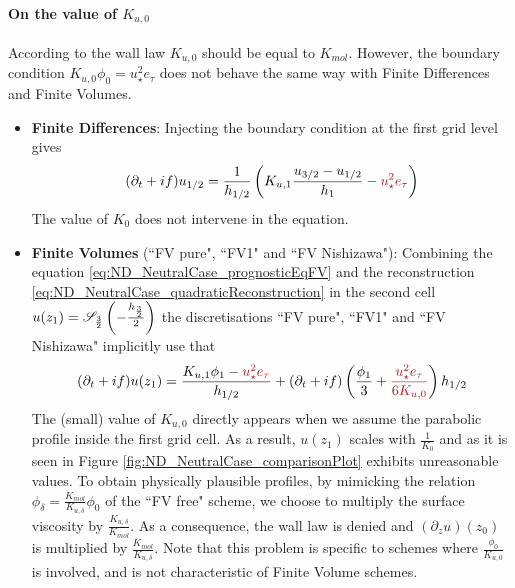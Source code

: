 \paragraph{On the value of $K_{u,0}$}
\label{sec:ND_StratifiedCase_viscosity0_FVpure}
According to the wall law $K_{u,0}$ should be equal to $K_{mol}$.
However, the boundary condition $K_{u,0} \phi_0 = u_\star^2 e_\tau$
does not behave the same way with Finite Differences and Finite
Volumes.
\begin{itemize}
	\item \textbf{Finite Differences}:
Injecting the boundary condition at the first grid level gives
		\begin{equation}
			(\partial_t+if) u_{1/2} = \frac{1}{h_{1/2}}
			\left(K_{u,1}\frac{u_{3/2} - u_{1/2}}{h_1}
			 - \emphase{u_\star^2 e_\tau} \right)
		\end{equation}
The value of $K_0$ does not intervene in the equation.
\item \textbf{Finite Volumes} (``FV pure", ``FV1" and ``FV Nishizawa"):
Combining the equation \eqref{eq:ND_NeutralCase_prognosticEqFV}
and the reconstruction
\eqref{eq:ND_NeutralCase_quadraticReconstruction} in the second cell
$u(z_1) = {\cal S}_{\frac{3}{2}}\left(-\frac{h_\frac{3}{2}}{2}\right)$
the discretisations ``FV pure", ``FV1" and ``FV Nishizawa"
implicitly use that
\begin{equation}
	(\partial_t+if) u(z_1) =
	\frac{K_{u,1} \phi_1 - \emphase{u_\star^2 e_\tau}}{h_{1/2}}
	+ (\partial_t+if)\left(\frac{\phi_1}{3}
	+ \emphase{\frac{u_\star^2 e_\tau}{6 K_{u,0}}}\right)h_{1/2}
\end{equation}
The (small) value of $K_{u,0}$ directly appears when we assume the
parabolic profile inside the first grid cell.
As a result, $u(z_1)$ scales with $\frac{1}{K_0}$ and
as it is seen in Figure \ref{fig:ND_NeutralCase_comparisonPlot}
exhibits unreasonable values.
To obtain physically plausible profiles,
by mimicking the relation
$\phi_{\delta} = \frac{K_{mol}}{K_{u,\delta}}\phi_0$ of the
``FV free" scheme, we choose to multiply the surface
viscosity by $\frac{K_{u,\delta}}{K_{mol}}$.
As a consequence, the wall law is denied and
$(\partial_z u)(z_0)$ is multiplied
by $\frac{K_{mol}}{K_{u,\delta}}$.
Note that this problem is specific to schemes where
$\frac{\phi_0}{K_{u,0}}$ is involved, and
is not characteristic of Finite Volume schemes.
\end{itemize}

